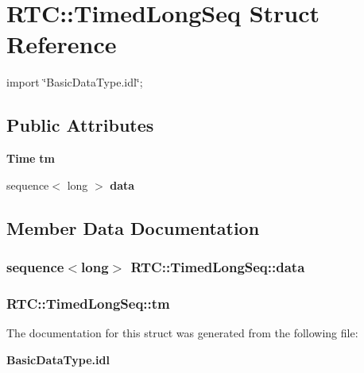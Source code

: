 \section{RTC::TimedLongSeq Struct Reference}
\label{structRTC_1_1TimedLongSeq}


{\ttfamily import \char`\"{}BasicDataType.idl\char`\"{};}

\subsection*{Public Attributes}
\begin{DoxyCompactItemize}
\item 
{\bf Time} {\bf tm}
\item 
sequence$<$ long $>$ {\bf data}
\end{DoxyCompactItemize}


\subsection{Member Data Documentation}
\subsubsection[{data}]{\setlength{\rightskip}{0pt plus 5cm}sequence$<$long$>$ {\bf RTC::TimedLongSeq::data}}\label{structRTC_1_1TimedLongSeq_a7cb12c9383805cd91d11667feec996a6}
\subsubsection[{tm}]{ {\bf RTC::TimedLongSeq::tm}}\label{structRTC_1_1TimedLongSeq_ad3b53881eff39c36d3d7718190bf3485}


The documentation for this struct was generated from the following file:\begin{DoxyCompactItemize}
\item 
{\bf BasicDataType.idl}\end{DoxyCompactItemize}
